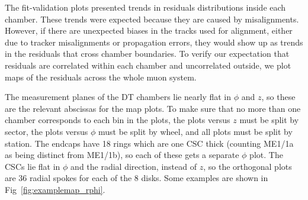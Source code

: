 \documentclass[12pt]{article}
\begin{document}
The fit-validation plots presented trends in residuals distributions
inside each chamber.  These trends were expected because they are
caused by misalignments.  However, if there are unexpected biases in
the tracks used for alignment, either due to tracker misalignments or
propagation errors, they would show up as trends in the residuals that
cross chamber boundaries.  To verify our expectation that residuals
are correlated within each chamber and uncorrelated outside, we plot
maps of the residuals across the whole muon system.

The measurement planes of the DT chambers lie nearly flat in $\phi$
and $z$, so these are the relevant abscissas for the map plots.  To
make sure that no more than one chamber corresponds to each bin in the
plots, the plots versus $z$ must be split by sector, the plots versus
$\phi$ must be split by wheel, and all plots must be split by station.
The endcaps have 18 rings which are one CSC thick (counting ME1/1a as
being distinct from ME1/1b), so each of these gets a separate $\phi$
plot.  The CSCs lie flat in $\phi$ and the radial direction, instead
of $z$, so the orthogonal plots are 36 radial spokes for each of the 8
disks.  Some examples are shown in Fig~\ref{fig:examplemap_rphi}.
\end{document}
